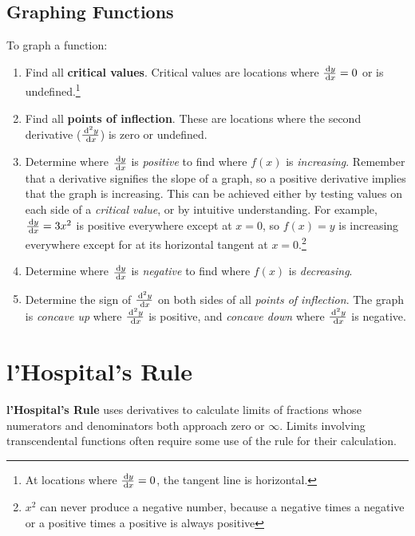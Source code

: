 \subsection{Graphing Functions}
To graph a function:
  \begin{enumerate}
   \item Find all \textbf{critical values}. Critical values are locations where $\frac{\,\mathrm{d} y}{\,\mathrm{d} x}=0$ or is undefined.\footnote{At locations where $\frac{\,\mathrm{d} y}{\,\mathrm{d} x}=0$, the tangent line is horizontal.}
   \item Find all \textbf{points of inflection}. These are locations where the second derivative ($\frac{\,\mathrm{d}^2y}{\,\mathrm{d} x}$) is zero or undefined.
   \item Determine where $\frac{\,\mathrm{d} y}{\,\mathrm{d} x}$ is \emph{positive} to find where $f(x)$ is \emph{increasing}. Remember that a derivative signifies the slope of a graph, so a positive derivative implies that the graph is increasing. This can be achieved either by testing values on each side of a \emph{critical value}, or by intuitive understanding. For example, $\frac{\,\mathrm{d} y}{\,\mathrm{d} x}=3x^2$ is positive everywhere except at $x=0$, so $f(x)=y$ is increasing everywhere except for at its horizontal tangent at $x=0$.\footnote{$x^2$ can never produce a negative number, because a negative times a negative or a positive times a positive is always positive}
   \item Determine where $\frac{\,\mathrm{d} y}{\,\mathrm{d} x}$ is \emph{negative} to find where $f(x)$ is \emph{decreasing}.
   \item Determine the sign of $\frac{\,\mathrm{d}^2y}{\,\mathrm{d} x}$ on both sides of all \emph{points of inflection}. The graph is \emph{concave up} where $\frac{\,\mathrm{d}^2y}{\,\mathrm{d} x}$ is positive, and \emph{concave down} where $\frac{\,\mathrm{d}^2y}{\,\mathrm{d} x}$ is negative.
  \end{enumerate}
\section{l'Hospital's Rule}

\textbf{l'Hospital's Rule} uses derivatives to calculate limits of fractions whose numerators and denominators both approach zero or $\infty$. Limits involving transcendental functions often require some use of the rule for their calculation.

